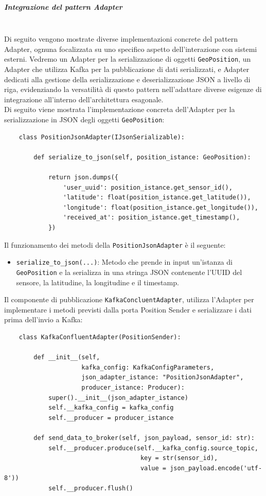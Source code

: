\documentclass[10pt]{article}
\newcommand{\mysubparagraph}[1]{\subparagraph{#1}\mbox{}\\}
\begin{document}
    \mysubparagraph{Integrazione del pattern Adapter}
    Di seguito vengono mostrate diverse implementazioni concrete del pattern Adapter, ognuna focalizzata su uno specifico aspetto dell'interazione con sistemi esterni. Vedremo un Adapter per la serializzazione di oggetti \texttt{GeoPosition}, un Adapter che utilizza Kafka per la pubblicazione di dati serializzati, e Adapter dedicati alla gestione della serializzazione e deserializzazione JSON a livello di riga, evidenziando la versatilità di questo pattern nell'adattare diverse esigenze di integrazione all'interno dell'architettura esagonale.\\
    Di seguito viene mostrata l’implementazione concreta dell’Adapter per la serializzazione in JSON degli oggetti \texttt{GeoPosition}:
    \begin{lstlisting}
    class PositionJsonAdapter(IJsonSerializable):

        def serialize_to_json(self, position_istance: GeoPosition):

            return json.dumps({
                'user_uuid': position_istance.get_sensor_id(),
                'latitude': float(position_istance.get_latitude()),
                'longitude': float(position_istance.get_longitude()),
                'received_at': position_istance.get_timestamp(),
            })
    \end{lstlisting}
    Il funzionamento dei metodi della \texttt{PositionJsonAdapter} è il seguente:
    \begin{itemize}
        \item \texttt{serialize\_to\_json(...)}: Metodo che prende in input un'istanza di \texttt{GeoPosition} e la serializza in una stringa JSON contenente l'UUID del sensore, la latitudine, la longitudine e il timestamp.
    \end{itemize}
    Il componente di pubblicazione \texttt{KafkaConcluentAdapter}, utilizza l'Adapter per implementare i metodi previsti dalla porta Position Sender e serializzare i dati prima dell'invio a Kafka:
    \begin{lstlisting}
    class KafkaConfluentAdapter(PositionSender):

        def __init__(self,
                     kafka_config: KafkaConfigParameters,
                     json_adapter_istance: "PositionJsonAdapter",
                     producer_istance: Producer):
            super().__init__(json_adapter_istance)
            self.__kafka_config = kafka_config
            self.__producer = producer_istance

        def send_data_to_broker(self, json_payload, sensor_id: str):
            self.__producer.produce(self.__kafka_config.source_topic,
                                     key = str(sensor_id),
                                     value = json_payload.encode('utf-8'))
            self.__producer.flush()
    \end{lstlisting}
\end{document}
